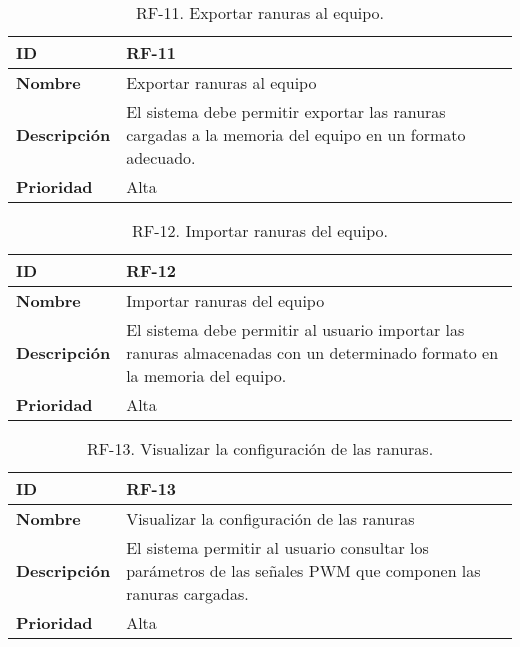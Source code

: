 \begin{table}[h!]
    \centering
    \caption{RF-11. Exportar ranuras al equipo.}
    \begin{tabular}{|m{2.5cm}|m{9.27cm}|}
        \hline
        \textbf{ID} & RF-11 \\
        \hline
        \textbf{Nombre} & Exportar ranuras al equipo \\
        \hline
        \textbf{Descripción} & El sistema debe permitir exportar las ranuras cargadas a la memoria del equipo en un formato adecuado. \\
        \hline
        \textbf{Prioridad} & Alta \\
        \hline
    \end{tabular}
\end{table}
\label{tab:rf11}

\begin{table}[h!]
    \centering
    \caption{RF-12. Importar ranuras del equipo.}
    \begin{tabular}{|m{2.5cm}|m{9.27cm}|}
        \hline
        \textbf{ID} & RF-12 \\
        \hline
        \textbf{Nombre} & Importar ranuras del equipo \\
        \hline
        \textbf{Descripción} & El sistema debe permitir al usuario importar las ranuras almacenadas con un determinado formato en la memoria del equipo. \\
        \hline
        \textbf{Prioridad} & Alta \\
        \hline
    \end{tabular}
\end{table}
\label{tab:rf12}

\begin{table}[h!]
    \centering
    \caption{RF-13. Visualizar la configuración de las ranuras.}
    \begin{tabular}{|m{2.5cm}|m{9.27cm}|}
        \hline
        \textbf{ID} & RF-13 \\
        \hline
        \textbf{Nombre} & Visualizar la configuración de las ranuras \\
        \hline
        \textbf{Descripción} & El sistema permitir al usuario consultar los parámetros de las señales PWM que componen las ranuras cargadas. \\
        \hline
        \textbf{Prioridad} & Alta \\
        \hline
    \end{tabular}
\end{table}

